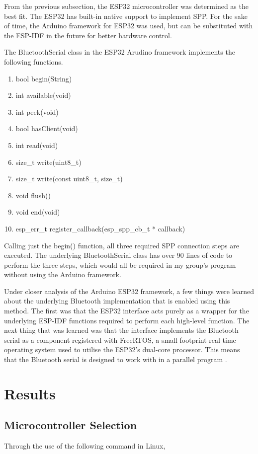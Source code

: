 \documentclass[12pt, titlepage]{article}
\begin{document}
From the previous subsection, the ESP32 microcontroller was determined as the best fit. The ESP32 has built-in native support to implement SPP. For the sake of time, the Arduino framework for ESP32 was used, but can be substituted with the ESP-IDF in the future for better hardware control.

The BluetoothSerial class in the ESP32 Arudino framework implements the following functions.

\begin{enumerate}
    \item bool begin(String)
    \item int available(void)
    \item int peek(void)
    \item bool hasClient(void)
    \item int read(void)
    \item size\_t write(uint8\_t)
    \item size\_t write(const uint8\_t, size\_t)
    \item void flush()
    \item void end(void)
    \item esp\_err\_t register\_callback(esp\_spp\_cb\_t * callback)
\end{enumerate}

Calling just the begin() function, all three required SPP connection steps are executed. The underlying BluetoothSerial class has over 90 lines of code to perform the three steps, which would all be required in my group's program without using the Arduino framework.

Under closer analysis of the Arduino ESP32 framework, a few things were learned about the underlying Bluetooth implementation that is enabled using this method. The first was that the ESP32 interface acts purely as a wrapper for the underlying ESP-IDF functions required to perform each high-level function. The next thing that was learned was that the interface implements the Bluetooth serial as a component registered with FreeRTOS, a small-footprint real-time operating system used to utilise the ESP32's dual-core processor. This means that the Bluetooth serial is designed to work with in a parallel program \cite{arduino-esp}.

\section{Results}
\subsection{Microcontroller Selection}
Through the use of the following command in Linux,
\end{document}
